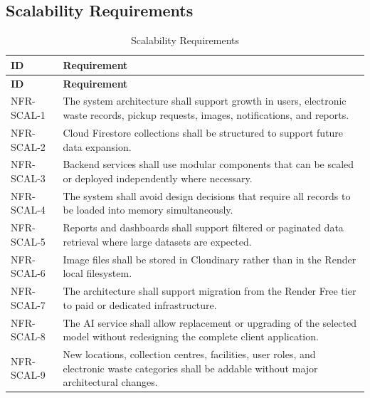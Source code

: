 \subsection{Scalability Requirements}
\begin{longtable}{@{}p{2.6cm}p{10.8cm}@{}}
\caption{Scalability Requirements} \label{tab:nfr-scal} \\
\toprule \textbf{ID} & \textbf{Requirement} \\ \midrule
\endfirsthead
\toprule \textbf{ID} & \textbf{Requirement} \\ \midrule
\endhead
NFR-SCAL-1 & The system architecture shall support growth in users, electronic waste records, pickup requests, images, notifications, and reports. \\
NFR-SCAL-2 & Cloud Firestore collections shall be structured to support future data expansion. \\
NFR-SCAL-3 & Backend services shall use modular components that can be scaled or deployed independently where necessary. \\
NFR-SCAL-4 & The system shall avoid design decisions that require all records to be loaded into memory simultaneously. \\
NFR-SCAL-5 & Reports and dashboards shall support filtered or paginated data retrieval where large datasets are expected. \\
NFR-SCAL-6 & Image files shall be stored in Cloudinary rather than in the Render local filesystem. \\
NFR-SCAL-7 & The architecture shall support migration from the Render Free tier to paid or dedicated infrastructure. \\
NFR-SCAL-8 & The AI service shall allow replacement or upgrading of the selected model without redesigning the complete client application. \\
NFR-SCAL-9 & New locations, collection centres, facilities, user roles, and electronic waste categories shall be addable without major architectural changes. \\
\bottomrule
\end{longtable}

